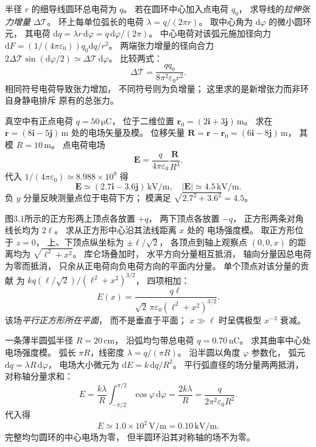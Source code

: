 半径 $r$ 的细导线圆环总电荷为 $q$。
若在圆环中心加入点电荷 $q_0$，
求导线的\emph{拉伸张力增量} $\Delta\mathcal T$。
\exsolution
环上每单位弧长的电荷
$\lambda=q/(2\pi r)$。
取中心角为 $\mathrm d\varphi$ 的微小圆环元，
其电荷
$\mathrm dq=\lambda r\,\mathrm d\varphi
=q\,\mathrm d\varphi/(2\pi)$。
中心电荷对该弧元施加径向力
$\mathrm dF=(1/(4\pi\varepsilon_0))
q_0\mathrm dq/r^2$。
两端张力增量的径向合力
$2\Delta\mathcal T\sin(\mathrm d\varphi/2)
\simeq\Delta\mathcal T\,\mathrm d\varphi$。
比较两式：
\[
\boxed{\Delta\mathcal T=
\frac{q q_0}{8\pi^2\varepsilon_0r^2}}.
\]
\excheck 相同符号电荷导致张力增加，
不同符号则为负增量；
这里求的是新增张力而非环自身静电排斥
原有的总张力。

真空中有正点电荷 $q=50\,\mathrm{\mu C}$，
位于二维位置
$\bm r_0=(2\bm i+3\bm j)\,\mathrm m$。
求在
$\bm r=(8\bm i-5\bm j)\,\mathrm m$
处的电场矢量及模。
\exsolution
位移矢量
$\bm R=\bm r-\bm r_0
=(6\bm i-8\bm j)\,\mathrm m$，
其模 $R=10\,\mathrm m$。
点电荷电场
\[
\bm E=\frac{q}{4\pi\varepsilon_0}
\frac{\bm R}{R^3}.
\]
代入
$1/(4\pi\varepsilon_0)\simeq8.988\times10^9$
得
\[
\boxed{\bm E\simeq
(2.7\bm i-3.6\bm j)\,\mathrm{kV/m}},
\quad
\boxed{|\bm E|\simeq4.5\,\mathrm{kV/m}}.
\]
\excheck 负 $y$ 分量反映测量点位于电荷下方；
模满足 $\sqrt{2.7^2+3.6^2}=4.5$。

图3.1所示的正方形两上顶点各放置 $+q$，
两下顶点各放置 $-q$，
正方形两条对角线长均为 $2\ell$。
求从正方形中心沿其法线距离 $x$ 处的
电场强度模。
\exsolution
取正方形位于 $z=0$，
上、下顶点纵坐标为
$\pm\ell/\sqrt2$，
各顶点到轴上观察点
$(0,0,x)$ 的距离均为
$\sqrt{\ell^2+x^2}$。
库仑场叠加时，
水平方向分量相互抵消，
轴向分量因总电荷为零而抵消，
只余从正电荷向负电荷方向的平面内分量。
单个顶点对该分量的贡献
为 $k q(\ell/\sqrt2)/(\ell^2+x^2)^{3/2}$，
四项相加：
\[
\boxed{E(x)=
\frac{q\ell}{\sqrt2\,\pi\varepsilon_0
(\ell^2+x^2)^{3/2}}}.
\]
\excheck 该场\emph{平行正方形所在平面}，
而不是垂直于平面；
$x\gg\ell$ 时呈偶极型 $x^{-3}$ 衰减。

一条薄半圆弧半径 $R=20\,\mathrm{cm}$，
沿弧均匀带总电荷 $q=0.70\,\mathrm{nC}$。
求其曲率中心处电场强度模。
\exsolution
弧长 $\pi R$，线密度
$\lambda=q/(\pi R)$。
沿半圆以角度 $\varphi$ 参数化，
弧元
$\mathrm dq=\lambda R\,\mathrm d\varphi$，
电场大小微元为
$\mathrm dE=k\,\mathrm dq/R^2$。
平行弧直径的场分量两两抵消，
对称轴分量求和：
\[
E=\frac{k\lambda}{R}
\int_{-\pi/2}^{\pi/2}\cos\varphi\,\mathrm d\varphi
=\frac{2k\lambda}R
=\boxed{\frac{q}{2\pi^2\varepsilon_0R^2}}.
\]
代入得
\[
\boxed{E\simeq1.0\times10^2\,\mathrm{V/m}
=0.10\,\mathrm{kV/m}}.
\]
\excheck 完整均匀圆环的中心电场为零，
但半圆环沿其对称轴的场不为零。

